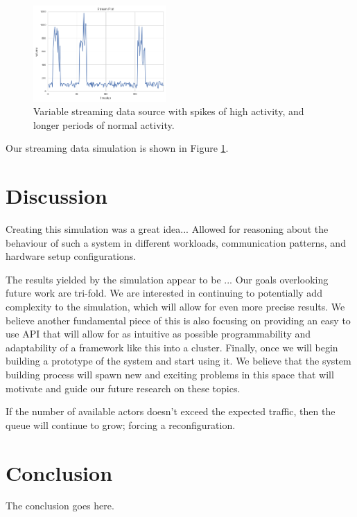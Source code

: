 \documentclass[conference,twocolumn,10pt]{IEEEtran}
\begin{document}
\begin{figure}[!h]
    \centering
    \includegraphics[width=0.45\textwidth]{streaming}
    \caption{Variable streaming data source with spikes of high activity, and longer periods of normal activity.}
    \label{fig:streaming}
\end{figure}

Our streaming data simulation is shown in Figure \ref{fig:streaming}.


\section{Discussion}

Creating this simulation was a great idea...
Allowed for reasoning about the behaviour of such a system in different workloads, communication patterns, and hardware setup configurations.

The results yielded by the simulation appear to be ...
Our goals overlooking future work are tri-fold. We are interested in continuing to potentially add complexity to the simulation, which will allow for even more precise results. We believe another fundamental piece of this is also focusing on providing an easy to use API that will allow for as intuitive as possible programmability and adaptability of a framework like this into a cluster. Finally, once we will begin building a prototype of the system and start using it.  We believe that the system building process will spawn new and exciting problems in this space that will motivate and guide our future research on these topics.

If the number of available actors doesn't exceed the expected traffic, then the queue will continue to grow; forcing a reconfiguration.

\section{Conclusion}
The conclusion goes here.
\end{document}
